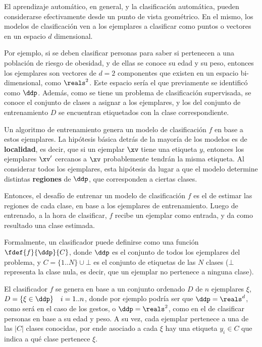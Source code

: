 El aprendizaje automático, en general, y la clasificación automática, pueden considerarse efectivamente desde un punto de vista geométrico. En el mismo, los modelos de clasificación ven a los ejemplares a clasificar como puntos o vectores en un espacio $d$ dimensional.

Por ejemplo, si se deben clasificar personas para saber si pertenecen a una población de riesgo de obesidad, y de ellas se conoce su edad y su peso, entonces los ejemplares son vectores de $d=2$ componentes que existen en un espacio bi-dimensional, como $\reals^2$. Este espacio sería el que previamente se identificó como $\ddp$. Además, como se tiene un problema de clasificación supervisada, se conoce el conjunto de clases a asignar a los ejemplares, y los del conjunto de entrenamiento $D$ se encuentran etiquetados con la clase correspondiente. 

Un algoritmo de entrenamiento genera un modelo de clasificación $f$ en base a estos ejemplares. La hipótesis básica detrás de la mayoría de los modelos es de \textbf{localidad}, es decir, que si un ejemplar $\xv$ tiene una etiqueta $y$, entonces los ejemplares $\xv'$ cercanos a $\xv$ probablemente tendrán la misma etiqueta. Al considerar todos los ejemplares, esta hipótesis da lugar a que el modelo determine distintas \textbf{regiones} de $\ddp$, que corresponden a ciertas clases.


Entonces, el desafío de entrenar un modelo de clasificación $f$ es el de estimar las regiones de cada clase, en base a los ejemplares de entrenamiento. Luego de entrenado, a la hora de clasificar, $f$ recibe un ejemplar como entrada, y da como resultado una clase estimada.


Formalmente, un clasificador puede definirse como una función $\fdef{f}{\ddp}{C}$, donde $\ddp$ es el conjunto de todos los ejemplares del problema, y $C=\{1..N\} \cup \bot $ es el conjunto de etiquetas de las $N$ clases ($\bot$ representa la clase nula, es decir, que un ejemplar no pertenece a ninguna clase). 

El clasificador $f$ se genera en base a un conjunto ordenado $D$ de $n$ ejemplares $\xi$,  $D= \{ \xi \in \ddp \} \quad i=1..n$, donde por ejemplo podría ser que $\ddp=\reals^d$, como será en el caso de los gestos, o $\ddp=\reals^2$, como en el de clasificar personas en base a su edad y peso. A su vez, cada ejemplar pertenece a una de las $|C|$ clases conocidas, por ende asociado a cada $\xi$ hay una etiqueta $y_i \in C$ que indica a qué clase pertenece $\xi$.

